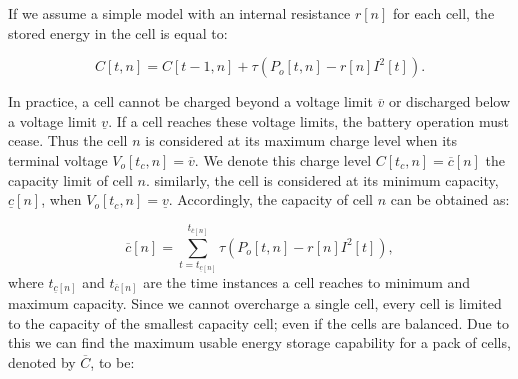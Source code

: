 \documentclass[10pt,twocolumn]{IEEEtran}
\begin{document}
If we assume a simple model with an internal resistance $r[n]$ for each cell, the stored energy in the cell is equal to:

\begin{equation}
C[t,n]=C[t-1,n] +  \tau(P_{o}[t,n] - r[n]I^2[t]).
\label{energycell}
\end{equation}

\noindent In practice,  a cell cannot be charged beyond a voltage limit $\overline{v}$ or discharged below a voltage limit $\underline{v}$.
If a cell reaches these voltage limits, the battery operation must cease.
Thus the cell $n$ is considered at its maximum charge level when its terminal voltage $V_{o}[t_c,n]=\overline{v}$.
We denote this charge level $C[t_c,n]=\overline{c}[n]$  the capacity limit of cell $n$.
similarly, the cell is considered at its minimum capacity, $\underline{c}[n]$, when $V_{o}[t_c,n]=\underline{v}$.
Accordingly, the capacity of cell $n$ can be obtained  as:

\begin{equation}
\overline{c}[n]=   \sum_{t=t_{\underline{c}[n]}}^{t_{\overline{c}[n]} } \tau(P_{o}[t,n] - r[n]I^2[t]),
\end{equation}
\noindent where $t_{\underline{c}[n]}$ and $t_{\overline{c}[n]}$ are the time instances a cell reaches to minimum and maximum capacity.
Since we cannot overcharge a single cell, every cell is limited to the capacity of the smallest capacity cell; even if the cells are balanced.
Due to this we can find the maximum usable energy storage capability for a pack of cells, denoted by $ \overline{C}$,  to be:
\end{document}
